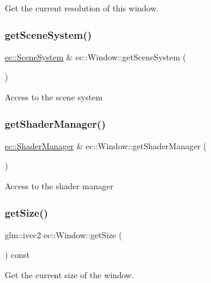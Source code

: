 Get the current resolution of this window. \mbox{\label{classec_1_1_window_a13d8cba249c2de0a5366c2507e887290}} 
\subsubsection{\texorpdfstring{get\+Scene\+System()}{getSceneSystem()}}
{\footnotesize\ttfamily \mbox{\hyperlink{classec_1_1_scene_system}{ec\+::\+Scene\+System}} \& ec\+::\+Window\+::get\+Scene\+System (\begin{DoxyParamCaption}{ }\end{DoxyParamCaption})}

Access to the scene system \mbox{\label{classec_1_1_window_adc63f54684ad3681c0d4bea8481b6322}} 
\subsubsection{\texorpdfstring{get\+Shader\+Manager()}{getShaderManager()}}
{\footnotesize\ttfamily \mbox{\hyperlink{classec_1_1_shader_manager}{ec\+::\+Shader\+Manager}} \& ec\+::\+Window\+::get\+Shader\+Manager (\begin{DoxyParamCaption}{ }\end{DoxyParamCaption})}

Access to the shader manager \mbox{\label{classec_1_1_window_a158535fbd92301f05ea6588b50abf5fb}} 
\subsubsection{\texorpdfstring{get\+Size()}{getSize()}}
{\footnotesize\ttfamily glm\+::ivec2 ec\+::\+Window\+::get\+Size (\begin{DoxyParamCaption}{ }\end{DoxyParamCaption}) const}

Get the current size of the window. \mbox{\label{classec_1_1_window_aa2c06032e48467991aa9de0861e2c7ea}} 
